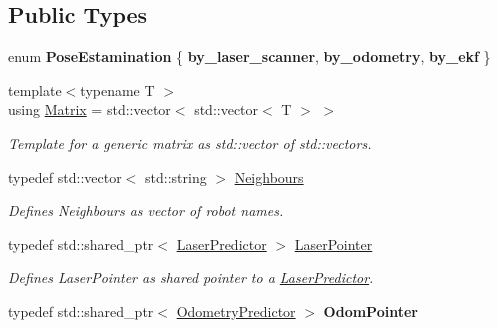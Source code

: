 \subsection*{Public Types}
\begin{DoxyCompactItemize}
\item 
enum {\bfseries Pose\+Estamination} \{ {\bfseries by\+\_\+laser\+\_\+scanner}, 
{\bfseries by\+\_\+odometry}, 
{\bfseries by\+\_\+ekf}
 \}\hypertarget{classFormation_a2717e351d4d88ac7eb481208ad072dfd}{}\label{classFormation_a2717e351d4d88ac7eb481208ad072dfd}

\item 
{\footnotesize template$<$typename T $>$ }\\using \hyperlink{classFormation_a227cd099c5171dd7a8f66cf010793e4e}{Matrix} = std\+::vector$<$ std\+::vector$<$ T $>$ $>$
\begin{DoxyCompactList}\small\item\em Template for a generic matrix as std\+::vector of std\+::vectors. \end{DoxyCompactList}\item 
typedef std\+::vector$<$ std\+::string $>$ \hyperlink{classFormation_a174a86b886bea3cb5d2c60526e73074d}{Neighbours}\hypertarget{classFormation_a174a86b886bea3cb5d2c60526e73074d}{}\label{classFormation_a174a86b886bea3cb5d2c60526e73074d}

\begin{DoxyCompactList}\small\item\em Defines Neighbours as vector of robot names. \end{DoxyCompactList}\item 
typedef std\+::shared\+\_\+ptr$<$ \hyperlink{classLaserPredictor}{Laser\+Predictor} $>$ \hyperlink{classFormation_a57c79726ce19c016f8cb19ebe1b7f379}{Laser\+Pointer}\hypertarget{classFormation_a57c79726ce19c016f8cb19ebe1b7f379}{}\label{classFormation_a57c79726ce19c016f8cb19ebe1b7f379}

\begin{DoxyCompactList}\small\item\em Defines Laser\+Pointer as shared pointer to a \hyperlink{classLaserPredictor}{Laser\+Predictor}. \end{DoxyCompactList}\item 
typedef std\+::shared\+\_\+ptr$<$ \hyperlink{classOdometryPredictor}{Odometry\+Predictor} $>$ {\bfseries Odom\+Pointer}\hypertarget{classFormation_a74a566bcc1caafd2ebda78f9dc104fd4}{}\label{classFormation_a74a566bcc1caafd2ebda78f9dc104fd4}


\end{DoxyCompactItemize}
